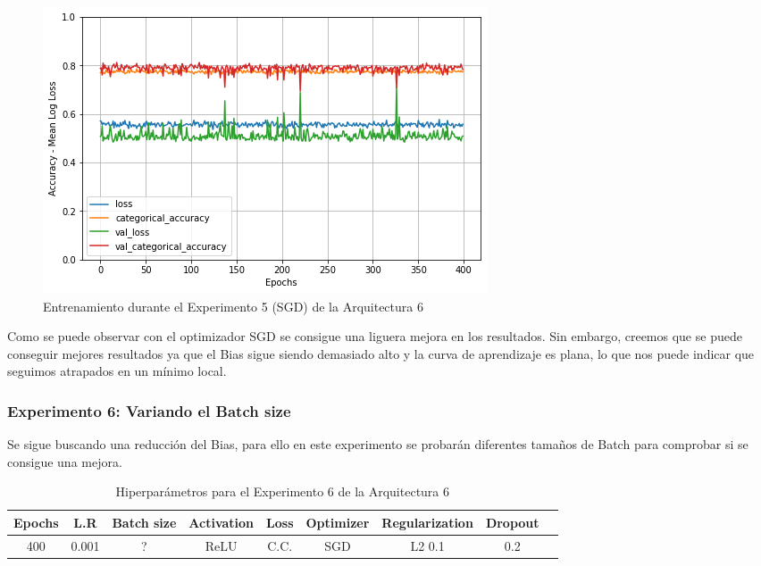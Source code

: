 \documentclass{article}
\begin{document}
   \begin{figure}[!h]
				\begin{center}
					\includegraphics[scale=0.5]{Images/tr-a6-e5(SGD).png}		
					\caption{Entrenamiento durante el Experimento 5 (SGD) de la Arquitectura 6}	
					\label{tab:tr-a6-e2}
				\end{center}
			\end{figure}
   
   Como se puede observar con el optimizador SGD se consigue una liguera mejora en los resultados. Sin embargo, creemos que se puede conseguir mejores resultados ya que el Bias sigue siendo demasiado alto y la curva de aprendizaje es plana, lo que nos puede indicar que seguimos atrapados en un mínimo local. 
   \subsubsection{Experimento 6: Variando el Batch size}

Se sigue buscando una reducci\'on del Bias, para ello en este experimento se probar\'an diferentes tama\~{n}os de Batch para comprobar si se consigue una mejora. 

    \begin{table}[!h]
				\begin{tabular}{|c|c|c|c|c|c|c|c|c|}
					\textbf{Epochs}&\textbf{L.R}&\textbf{Batch size}&\textbf{Activation}&\textbf{Loss}&\textbf{Optimizer}&\textbf{Regularization}&\textbf{Dropout}   \\ \hline
					400 & 0.001 & ?& ReLU & C.C. & SGD & L2 0.1 & 0.2 
				\end{tabular}
				\caption{Hiperpar\'ametros para el Experimento 6 de la Arquitectura 6}
				\label{tab:hip-a6-e2}
			\end{table}
\end{document}
